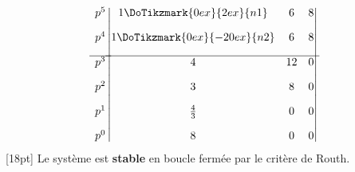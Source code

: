 \[
\begin{matrix}
    p^5 \\[1em]
    p^4 \\[1em]
    \hline
    p^3 \\[1em]
    p^2 \\[1em]
    p^1 \\[1em]
    p^0 
\end{matrix}
\begin{vmatrix}
    1\DoTikzmark{0ex}{2ex}{n1}    & 6 & 8 \\[1em]
    1\DoTikzmark{0ex}{-20ex}{n2}  & 6 & 8 \\[1em] 
    \hline
    4 & 12 & 0\\[1em]
    3 & 8 & 0\\[1em]
    \frac{4}{3} & 0      & 0\\[1em]
    8 & 0 & 0
\end{vmatrix}
\]
[18pt]
Le système est \textbf{stable} en boucle fermée par le critère de Routh.


